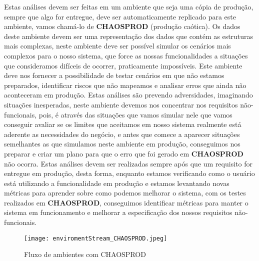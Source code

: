       Estas análises devem ser feitas em um ambiente que seja uma cópia de produção,
      sempre que algo for entregue, deve ser automaticamente replicado para este
      ambiente, vamos chamá-lo de \textbf{CHAOSPROD} (produção caótica). Os dados
      deste ambiente devem ser uma representação dos dados que contém as estruturas
      mais complexas, neste ambiente deve ser possível simular os cenários mais
      complexos para o nosso sistema, que force as nossas funcionalidades a situações
      que consideramos difíceis de ocorrer, praticamente impossíveis. Este ambiente
      deve nos fornecer a possibilidade de testar cenários em que não estamos preparados,
      identificar riscos que não mapeamos e analisar erros que ainda não aconteceram
      em produção. \newline
      Estas análises são prevendo adversidades, imaginando situações inesperadas,
      neste ambiente devemos nos concentrar nos requisitos não-funcionais, pois,
      é através das situações que vamos simular nele que vamos conseguir avaliar
      se os limites que aceitamos em nosso sistema realmente está aderente as
      necessidades do negócio, e antes que comece a aparecer situações semelhantes as
      que simulamos neste ambiente em produção, conseguimos nos preparar e criar
      um plano para que o erro que foi gerado em \textbf{CHAOSPROD} não ocorra.
      Estas análises devem ser realizadas sempre após que um requisito for entregue
      em produção, desta forma, enquanto estamos verificando como o usuário está
      utilizando a funcionalidade em produção e estamos levantando novas métricas
      para aprender sobre como podemos melhorar o sistema, com os testes realizados
      em \textbf{CHAOSPROD}, conseguimos identificar métricas para manter o
      sistema em funcionamento e melhorar a especificação dos nossos requisitos
      não-funcionais.

      \begin{figure}[!h]
        \centering
        \texttt{[image: enviromentStream\_CHAOSPROD.jpeg]}
        \caption{Fluxo de ambientes com CHAOSPROD}
        \label{Imagem:3}
      \end{figure}

